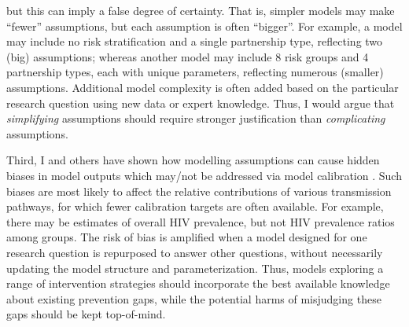 but this can imply a false degree of certainty.
That is, simpler models may make ``fewer'' assumptions, but each assumption is often ``bigger''.
For example, a model may include no risk stratification and a single partnership type,
reflecting two (big) assumptions; whereas
another model may include 8 risk groups and 4 partnership types, each with unique parameters,
reflecting numerous (smaller) assumptions.
Additional model complexity is often added based on the particular research question
using new data or expert knowledge.
Thus, I would argue that \emph{simplifying} assumptions
should require stronger justification than \emph{complicating} assumptions.
\par
Third, I and others have shown how modelling assumptions can cause
hidden biases in model outputs which may/not be addressed via model calibration
\cite{Hontelez2013,Johnson2016mf,Bernard2017,Knight2020}.
Such biases are most likely to affect
the relative contributions of various transmission pathways,
for which fewer calibration targets are often available.
For example, there may be estimates of overall HIV prevalence,
but not HIV prevalence ratios among groups.
The risk of bias is amplified when a model designed for one research question
is repurposed to answer other questions,
without necessarily updating the model structure and parameterization.
Thus, models exploring a range of intervention strategies
should incorporate the best available knowledge about existing prevention gaps,
while the potential harms of misjudging these gaps should be kept top-of-mind.
